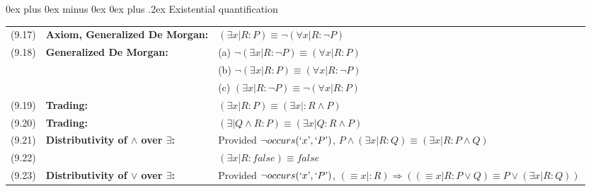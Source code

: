 \documentclass[letterpaper, 8pt]{extarticle}
\makeatletter
\renewcommand{\subsection}{\@startsection{subsection}{2}{0mm}%
                                {0ex plus 0ex minus 0ex}%
                                {0ex plus .2ex}%
                                {\normalfont\small\bfseries}}
\newcommand{\To}{\Rightarrow}
\makeatother
\begin{document}
\begin{multicols*}{3}
    \subsection{Existential quantification}
    \begin{tabulary}{\linewidth}{@{}lLL@{}}
        (9.17) & \textbf{Axiom, Generalized De Morgan:}             & $(\exists x | R : P) \equiv \neg (\forall x | R : \neg P)$                                                                                                                 \\
        (9.18) & \textbf{Generalized De Morgan:}                    & (a) $\neg (\exists x | R : \neg P) \equiv (\forall x | R : P)$                                                                                                             \\
        &                                                    & (b) $\neg(\exists x | R : P) \equiv (\forall x | R : \neg P)$                                                                                                              \\
        &                                                    & (c) $(\exists x | R : \neg P) \equiv \neg(\forall x | R : P)$                                                                                                              \\
        (9.19) & \textbf{Trading:}                                  & $(\exists x | R : P) \equiv (\exists x |: R \land P)$                                                                                                                      \\
        (9.20) & \textbf{Trading:}                                  & $(\exists | Q \land R : P) \equiv (\exists x | Q : R \land P)$                                                                                                             \\
        (9.21) & \textbf{Distributivity of $\land$ over $\exists$:} & Provided $\neg occurs(`x\textrm', `P\textrm')$, $P \land (\exists x | R : Q) \equiv (\exists x | R : P \land Q)$                                                           \\
        (9.22) &                                                    & $(\exists x | R : false) \equiv false$                                                                                                                                     \\
        (9.23) & \textbf{Distributivity of $\lor$ over $\exists$:}  & Provided $\neg occurs(`x\textrm', `P\textrm')$, $(\equiv x |: R) \To ((\equiv x | R : P \lor Q) \equiv P \lor (\exists x | R : Q))$                                        \\

\end{tabulary}
\end{multicols*}
\end{document}
